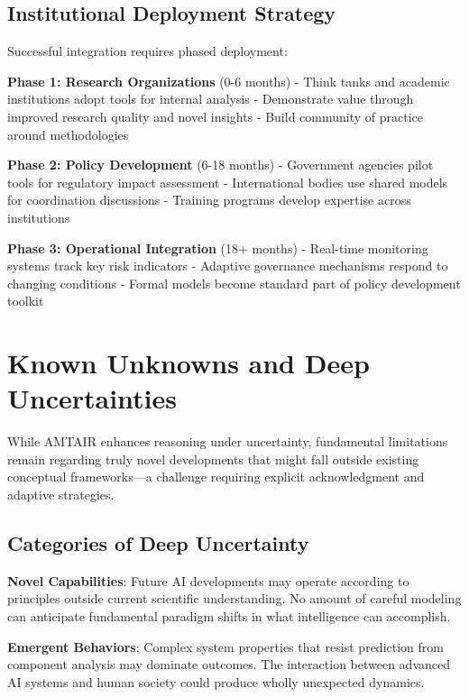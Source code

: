 \documentclass[
  11pt,
  letterpaper,
]{book}
\begin{document}
\subsection{Institutional Deployment
Strategy}\label{sec-deployment-strategy}

Successful integration requires phased deployment:

\textbf{Phase 1: Research Organizations} (0-6 months) - Think tanks and
academic institutions adopt tools for internal analysis - Demonstrate
value through improved research quality and novel insights - Build
community of practice around methodologies

\textbf{Phase 2: Policy Development} (6-18 months) - Government agencies
pilot tools for regulatory impact assessment - International bodies use
shared models for coordination discussions - Training programs develop
expertise across institutions

\textbf{Phase 3: Operational Integration} (18+ months) - Real-time
monitoring systems track key risk indicators - Adaptive governance
mechanisms respond to changing conditions - Formal models become
standard part of policy development toolkit

\section{Known Unknowns and Deep
Uncertainties}\label{sec-deep-uncertainties}

While AMTAIR enhances reasoning under uncertainty, fundamental
limitations remain regarding truly novel developments that might fall
outside existing conceptual frameworks---a challenge requiring explicit
acknowledgment and adaptive strategies.

\subsection{Categories of Deep
Uncertainty}\label{sec-uncertainty-categories}

\textbf{Novel Capabilities}: Future AI developments may operate
according to principles outside current scientific understanding. No
amount of careful modeling can anticipate fundamental paradigm shifts in
what intelligence can accomplish.

\textbf{Emergent Behaviors}: Complex system properties that resist
prediction from component analysis may dominate outcomes. The
interaction between advanced AI systems and human society could produce
wholly unexpected dynamics.
\end{document}
